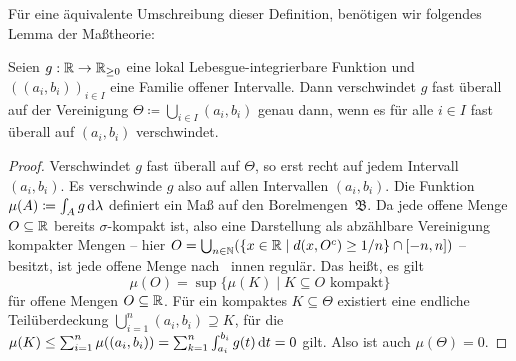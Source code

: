 Für eine äquivalente Umschreibung dieser Definition, benötigen wir folgendes Lemma der Maßtheorie:

\begin{lemma}\label{lemma-vanishes-intervals}
	Seien $g: \mathbb{R} \to \mathbb{R}_{\geq 0}$ eine lokal Lebesgue-integrierbare Funktion und $((a_i, b_i))_{i\in I}$ eine Familie offener Intervalle.
	Dann verschwindet $g$ fast überall auf der Vereinigung $\Theta\coloneq \bigcup_{i\in I} (a_i, b_i)$ genau dann, wenn es für alle $i\in I$ fast überall auf $(a_i, b_i)$ verschwindet.
\end{lemma}
\begin{proof}
	Verschwindet $g$ fast überall auf $\Theta$, so erst recht auf jedem Intervall $(a_i, b_i)$.
	Es verschwinde $g$ also auf allen Intervallen $(a_i, b_i)$.
	Die Funktion $\mu(A)\coloneq \int_A g \mathop{}\!\mathrm{d} \lambda$ definiert ein Maß auf den Borelmengen~$\mathfrak{B}$.
	Da jede offene Menge $O\subseteq\mathbb{R}$ bereits $\sigma$-kompakt ist, also eine Darstellung als abzählbare Vereinigung kompakter Mengen -- hier $O=\bigcup_{n\in\mathbb{N}}(\{ x \in\mathbb{R} \mid d(x, O^c) \geq 1/n \} \cap [-n, n] )$ -- besitzt, ist jede offene Menge nach~\cite[Kap. VIII, 1.2 Folgerungen (e)]{Elstrodt2011} innen regulär.
	Das heißt, es gilt
	\[ \mu(O)=\sup\{ \mu(K) \mid K\subseteq O \text{ kompakt} \} \]
	für offene Mengen $O\subseteq\mathbb{R}$.
	Für ein kompaktes $K\subseteq \Theta$ existiert eine endliche Teil\-über\-deckung $\bigcup_{i=1}^n (a_i, b_i) \supseteq K$, für die $\mu(K) \leq \sum_{i=1}^{n} \mu((a_i, b_i)) = \sum_{k=1}^{n} \int_{a_i}^{b_i} g(t) \mathop{}\!\mathrm{d} t = 0$ gilt.
	Also ist auch $\mu(\Theta)=0$.
\end{proof}

